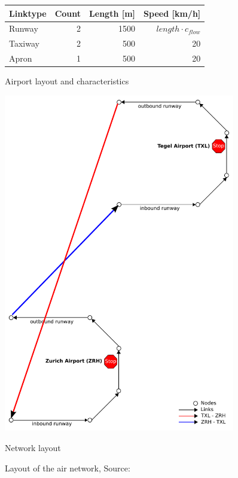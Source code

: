 \begin{figure}[t]
\begin{minipage}{0.5\linewidth}
			\footnotesize
			\begin{tabular}{@{}lrrr@{}}
				Linktype & Count & Length [m] & Speed [km/h] \\
				\hline
				Runway   	& 2					& 1500		& $length \cdot c_{flow} $  	\\ %
				Taxiway   	& 2					& 500		& 20  	\\
				Apron   		& 1					& 500		& 20  	\\
				\end{tabular}		
				\vspace{1.4cm}
				\caption{Airport layout and characteristics}
				\label{fig:matsim_airport}
	\end{minipage}
	\begin{minipage}{0.5\linewidth}
		\centering
		\includegraphics[width=0.9\textwidth]{extending/figures/air/sf_airport_network_no_slide.pdf}
		\caption{Network layout}
		\label{fig:matsim_network_model}
	\end{minipage}
	\caption{Layout of the air network, Source:~\citet{Grether2014PhD}}
	\label{fig:air_network}
\end{figure}


